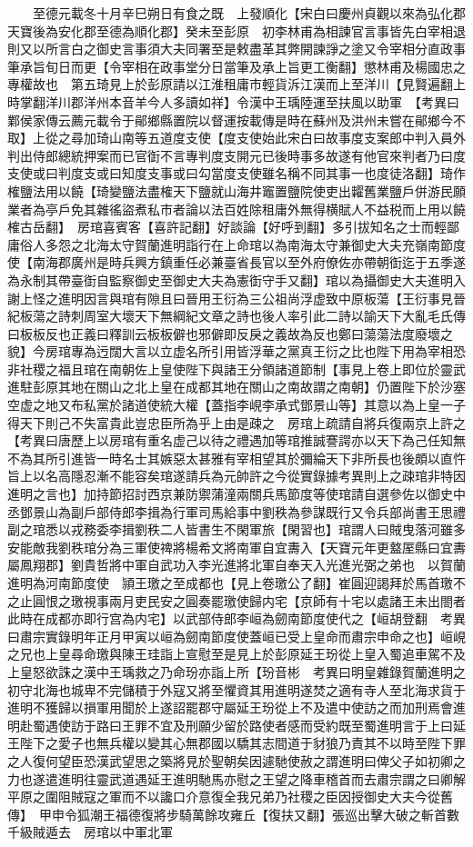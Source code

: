 　　至德元載冬十月辛巳朔日有食之既　上發順化【宋白曰慶州貞觀以來為弘化郡天寶後為安化郡至德為順化郡】癸未至彭原　初李林甫為相諫官言事皆先白宰相退則又以所言白之御史言事須大夫同署至是敕盡革其弊開諫諍之塗又令宰相分直政事筆承旨旬日而更【令宰相在政事堂分日當筆及承上旨更工衡翻】懲林甫及楊國忠之專權故也　第五琦見上於彭原請以江淮租庸市輕貨泝江漢而上至洋川【見賢遍翻上時掌翻洋川郡洋州本音羊今人多讀如祥】令漢中王瑀陸運至扶風以助軍　【考異曰鄴侯家傳云薦元載令于鄖鄉縣置院以督運按載傳是時在蘇州及洪州未嘗在鄖鄉今不取】上從之尋加琦山南等五道度支使【度支使始此宋白曰故事度支案郎中判入員外判出侍郎總統押案而已官衘不言專判度支開元已後時事多故遂有他官來判者乃曰度支使或曰判度支或曰知度支事或曰勾當度支使雖名稱不同其事一也度徒洛翻】琦作榷鹽法用以饒【琦變鹽法盡榷天下鹽就山海井竈置鹽院使吏出糶舊業鹽戶併游民願業者為亭戶免其雜徭盜煮私市者論以法百姓除租庸外無得横賦人不益税而上用以饒榷古岳翻】　房琯喜賓客【喜許記翻】好談論【好呼到翻】多引拔知名之士而輕鄙庸俗人多怨之北海太守賀蘭進明詣行在上命琯以為南海太守兼御史大夫充嶺南節度使【南海郡廣州是時兵興方鎮重任必兼臺省長官以至外府僚佐亦帶朝衘迄于五季遂為永制其帶臺衘自監察御史至御史大夫為憲衘守手又翻】琯以為攝御史大夫進明入謝上怪之進明因言與琯有隙且曰晉用王衍為三公祖尚浮虚致中原板蕩【王衍事見晉紀板蕩之詩刺周室大壞天下無綱紀文章之詩也後人率引此二詩以諭天下大亂毛氏傳曰板板反也正義曰釋訓云板板僻也邪僻即反戾之義故為反也鄭曰蕩蕩法度廢壞之貌】今房琯專為迃闊大言以立虚名所引用皆浮華之黨真王衍之比也陛下用為宰相恐非社稷之福且琯在南朝佐上皇使陛下與諸王分領諸道節制【事見上卷上即位於靈武進駐彭原其地在關山之北上皇在成都其地在關山之南故謂之南朝】仍置陛下於沙塞空虚之地又布私黨於諸道使統大權【蓋指李峴李承式鄧景山等】其意以為上皇一子得天下則己不失富貴此豈忠臣所為乎上由是疎之　房琯上疏請自將兵復兩京上許之　【考異曰唐歷上以房琯有重名虚己以待之禮遇加等琯推誠謇諤亦以天下為己任知無不為其所引進皆一時名士其嫉惡太甚雅有宰相望其於彌綸天下非所長也後頗以直忤旨上以名高隱忍漸不能容矣琯遂請兵為元帥許之今從實錄據考異則上之疎琯非特因進明之言也】加持節招討西京兼防禦蒲潼兩關兵馬節度等使琯請自選參佐以御史中丞鄧景山為副戶部侍郎李揖為行軍司馬給事中劉秩為參謀既行又令兵部尚書王思禮副之琯悉以戎務委李揖劉秩二人皆書生不閑軍旅【閑習也】琯謂人曰賊曳落河雖多安能敵我劉秩琯分為三軍使禆將楊希文將南軍自宜夀入【天寶元年更盩厔縣曰宜夀屬鳳翔郡】劉貴哲將中軍自武功入李光進將北軍自奉天入光進光弼之弟也　以賀蘭進明為河南節度使　頴王璬之至成都也【見上卷璬公了翻】崔圓迎謁拜於馬首璬不之止圓恨之璬視事兩月吏民安之圓奏罷璬使歸内宅【京師有十宅以處諸王未出閤者此時在成都亦即行宫為内宅】以武部侍郎李峘為劒南節度使代之【峘胡登翻　考異曰肅宗實錄明年正月甲寅以峘為劒南節度使蓋峘已受上皇命而肅宗申命之也】峘峴之兄也上皇尋命璬與陳王珪詣上宣慰至是見上於彭原延王玢從上皇入蜀追車駕不及上皇怒欲誅之漢中王瑀救之乃命玢亦詣上所【玢音彬　考異曰明皇雜錄賀蘭進明之初守北海也城卑不完儲積于外寇又將至懼資其用進明遂焚之適有寺人至北海求貨于進明不獲歸以損軍用聞於上遂詔罷郡守屬延王玢從上不及遣中使訪之而加刑焉會進明赴蜀遇使訪于路曰王罪不宜及刑願少留於路使者感而受約既至蜀進明言于上曰延王陛下之愛子也無兵權以變其心無郡國以驕其志間道于豺狼乃責其不以時至陛下罪之人復何望臣恐漢武望思之築將見於聖朝矣因遽馳使赦之謂進明曰俾父子如初卿之力也遂遣進明往靈武道遇延王進明馳馬亦慰之王望之降車稽首而去肅宗謂之曰卿解平原之圍阻賊寇之軍而不以讒口介意復全我兄弟乃社稷之臣因授御史大夫今從舊傳】　甲申令狐潮王福德復將步騎萬餘攻雍丘【復扶又翻】張巡出擊大破之斬首數千級賊遁去　房琯以中軍北軍